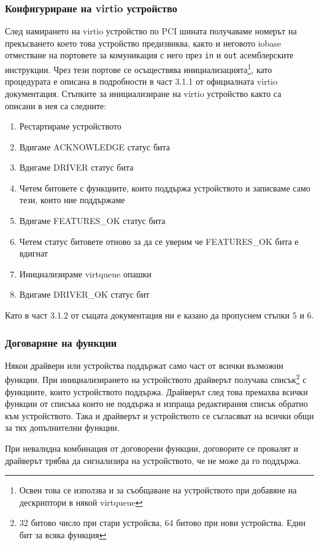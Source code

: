 \subsubsection{Конфигуриране на virtio устройство} \label{virtioinit}
След намирането на virtio устройство по PCI шината получаваме номерът на прекъсването което това устройство предизвиква, както и неговото iobase отместване на портовете за комуникация с него през {\tt in} и {\tt out} асемблерските инструкции. Чрез тези портове се осъществява инициализацията\footnote{Освен това се използва и за съобщаване на устройството при добавяне на дескриптори в някой virtqueue}, като процедурата е описана в подробности в част 3.1.1 от официалната virtio документация\parencite{virtiodocs}. Стъпките за инициализиране на virtio устройство както са описани в нея са следните:
\begin{enumerate}
  \item Рестартираме устройството
  \item Вдигаме ACKNOWLEDGE статус бита
  \item Вдигаме DRIVER статус бита
  \item Четем битовете с функциите, които поддържа устройството и записваме само тези, които ние поддържаме
  \item Вдигаме FEATURES\_OK статус бита
  \item Четем статус битовете отново за да се уверим че FEATURES\_OK бита е вдигнат
  \item Инициализираме virtqueue опашки
  \item Вдигаме DRIVER\_OK статус бит
\end{enumerate}
Като в част 3.1.2 от същата документация ни е казано да пропуснем стъпки 5 и 6.

\subsubsection{Договаряне на функции}
Някои драйвери или устройства поддържат само част от всички възможни функции. При инициализирането на устройството драйверът получава списък\footnote{32 битово число при стари устройсва, 64 битово при нови устройства. Един бит за всяка функция} с функциите, които устройството поддържа. Драйверът след това премахва всички функции от списъка които не поддържа и изпраща редактирания списък обратно към устройството. Така и драйверът и устройството се съгласяват на всички общи за тях допълнителни функции.

При невалидна комбинация от договорени функции, договорите се провалят и драйверът трябва да сигнализира на устройството, че не може да го поддържа.

